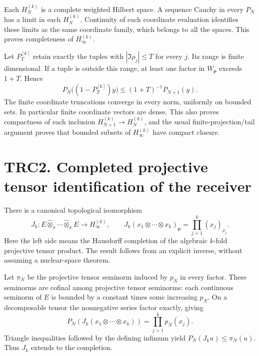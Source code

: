Each \(H_N^{(k)}\) is a complete weighted Hilbert space. A sequence
Cauchy in every \(P_N\) has a limit in each \(H_N^{(k)}\). Continuity of
each coordinate evaluation identifies these limits as the same
coordinate family, which belongs to all the spaces. This proves
completeness of \(H_\infty^{(k)}\).

Let \(P_T^{[k]}\) retain exactly the tuples with \(|\Im\rho_j|\le T\)
for every \(j\). Its range is finite dimensional. If a tuple is outside
this range, at least one factor in \(W_{\boldsymbol\rho}\) exceeds
\(1+T\). Hence \[
P_N\bigl((1-P_T^{[k]})y\bigr)
\le (1+T)^{-1}P_{N+1}(y).
\tag{TRC1.2}
\] The finite coordinate truncations converge in every norm, uniformly
on bounded sets. In particular finite coordinate vectors are dense. This
also proves compactness of each inclusion
\(H_{N+1}^{(k)}\to H_N^{(k)}\), and the usual finite-projection/tail
argument proves that bounded subsets of \(H_\infty^{(k)}\) have compact
closure.

\section{TRC2. Completed projective tensor identification of the
receiver}\label{trc2.-completed-projective-tensor-identification-of-the-receiver}

There is a canonical topological isomorphism \[
J_k:E\widehat\otimes_\pi\cdots\widehat\otimes_\pi E
\longrightarrow H_\infty^{(k)},\qquad
J_k(x_1\otimes\cdots\otimes x_k)_{\boldsymbol\rho}
=\prod_{j=1}^k(x_j)_{\rho_j}.
\tag{TRC2.1}
\] Here the left side means the Hausdorff completion of the algebraic
\(k\)-fold projective tensor product. The result follows from an
explicit inverse, without assuming a nuclear-space theorem.

Let \(\pi_N\) be the projective tensor seminorm induced by \(p_N\) in
every factor. These seminorms are cofinal among projective tensor
seminorms: each continuous seminorm of \(E\) is bounded by a constant
times some increasing \(p_N\). On a decomposable tensor the nonnegative
series factor exactly, giving \[
P_N(J_k(x_1\otimes\cdots\otimes x_k))
=\prod_{j=1}^k p_N(x_j).
\tag{TRC2.2}
\] Triangle inequalities followed by the defining infimum yield
\(P_N(J_ku)\le\pi_N(u)\). Thus \(J_k\) extends to the completion.

